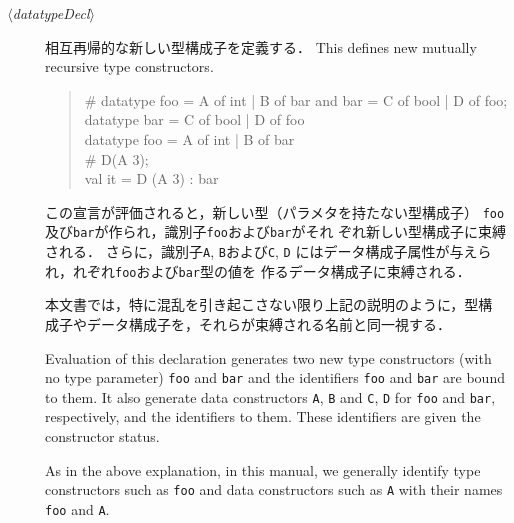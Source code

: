\documentclass{jbook}
\newcommand{\code}[1]{\mbox{\large\tt #1}}
\newcommand{\nonterm}[1]{\mbox{$\,\langle$}{\it #1}\mbox{$\rangle\,$}}
\newenvironment{program}{\begin{quote}\begin{tt}}%
                        {\end{tt}\end{quote}}
\begin{document}
\begin{description}
\item[\nonterm{datatypeDecl}] 
\ifjp%
	相互再帰的な新しい型構成子を定義する．
\else%
	This defines new mutually recursive type constructors.
\fi%
\begin{program}
  \# datatype foo = A of int | B of bar and bar = C of bool | D of foo; \\
  datatype bar = C of bool | D of foo\\
  datatype foo = A of int | B of bar\\
  \# D(A 3);\\
  val it = D (A 3) : bar\\
\end{program}
\ifjp%
	この宣言が評価されると，新しい型（パラメタを持たない型構成子）
\code{foo}及び\code{bar}が作られ，識別子\code{foo}および\code{bar}がそれ
ぞれ新しい型構成子に束縛される．
	さらに，識別子\code{A}, \code{B}および\code{C}, \code{D}
にはデータ構成子属性が与えられ，れぞれ\code{foo}および\code{bar}型の値を
作るデータ構成子に束縛される．

	本文書では，特に混乱を引き起こさない限り上記の説明のように，型構
成子やデータ構成子を，それらが束縛される名前と同一視する．

\else%
	Evaluation of this declaration generates two new type constructors
(with no type parameter) \code{foo} and \code{bar} and the identifiers
\code{foo} and \code{bar} are bound to them.
	It also generate data constructors \code{A}, \code{B} and
\code{C}, \code{D} for \code{foo} and \code{bar}, respectively, 
and the identifiers to them.
	These identifiers are given the constructor status.

	As in the above explanation, in this manual, we generally
identify type constructors such as \code{foo}  and data constructors
such as \code{A} with their names \code{foo} and \code{A}.
\fi%


\end{description}
\end{document}
